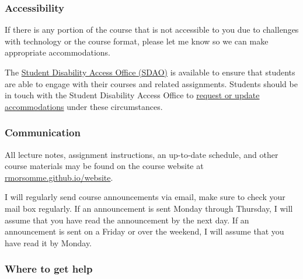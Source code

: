 \documentclass[
  letterpaper,
  DIV=11,
  numbers=noendperiod]{scrartcl}
\begin{document}
\hypertarget{accessibility}{%
\subsubsection{Accessibility}\label{accessibility}}

If there is any portion of the course that is not accessible to you due
to challenges with technology or the course format, please let me know
so we can make appropriate accommodations.

The \href{https://access.duke.edu/students}{Student Disability Access
Office (SDAO)} is available to ensure that students are able to engage
with their courses and related assignments. Students should be in touch
with the Student Disability Access Office to
\href{https://access.duke.edu/requests}{request or update
accommodations} under these circumstances.

\hypertarget{communication}{%
\subsubsection{Communication}\label{communication}}

All lecture notes, assignment instructions, an up-to-date schedule, and
other course materials may be found on the course website at
\href{https://rmorsomme.github.io/website}{rmorsomme.github.io/website}.

I will regularly send course announcements via email, make sure to check
your mail box regularly. If an announcement is sent Monday through
Thursday, I will assume that you have read the announcement by the next
day. If an announcement is sent on a Friday or over the weekend, I will
assume that you have read it by Monday.

\hypertarget{where-to-get-help}{%
\subsubsection{Where to get help}\label{where-to-get-help}}
\end{document}
